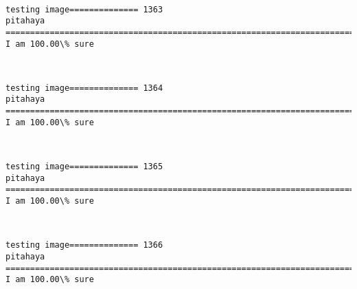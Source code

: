 \documentclass[11pt]{article}
\begin{document}
    \begin{center}
    \end{center}
    { \hspace*{\fill} \\}
    
    \begin{Verbatim}[commandchars=\\\{\}]
testing image============== 1363
pitahaya
============================================================================
I am 100.00\% sure

    \end{Verbatim}

    \begin{center}
    \end{center}
    { \hspace*{\fill} \\}
    
    \begin{Verbatim}[commandchars=\\\{\}]
testing image============== 1364
pitahaya
============================================================================
I am 100.00\% sure

    \end{Verbatim}

    \begin{center}
    \end{center}
    { \hspace*{\fill} \\}
    
    \begin{Verbatim}[commandchars=\\\{\}]
testing image============== 1365
pitahaya
============================================================================
I am 100.00\% sure

    \end{Verbatim}

    \begin{center}
    \end{center}
    { \hspace*{\fill} \\}
    
    \begin{Verbatim}[commandchars=\\\{\}]
testing image============== 1366
pitahaya
============================================================================
I am 100.00\% sure

    \end{Verbatim}
\end{document}
